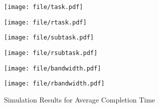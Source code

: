 \documentclass[10pt, conference, letterpaper]{IEEEtran}
\begin{document}
\begin{figure}[t]
    \centering
    \vspace{-0.35cm} %
	\subfigtopskip=2pt %
	\subfigbottomskip=1pt %
	\subfigcapskip=-5pt %
	\begin{minipage}[t]{0.48\linewidth}
		\centering
		\texttt{[image: file/task.pdf]}
		\label{fig_task}
	\end{minipage}
	\begin{minipage}[t]{0.48\linewidth}
		\centering
		\texttt{[image: file/rtask.pdf]}
		\label{fig_rtask}
	\end{minipage}\vspace{-10pt}
    
	\begin{minipage}[t]{0.48\linewidth}
		\texttt{[image: file/subtask.pdf]}
		\label{fig_subtask}
	\end{minipage}
	\begin{minipage}[t]{0.48\linewidth}
		\centering
		\texttt{[image: file/rsubtask.pdf]}
		\label{fig_rsubtask}
	\end{minipage}\vspace{-10pt}
    
	\begin{minipage}[t]{0.48\linewidth}
		\centering
		\texttt{[image: file/bandwidth.pdf]}
		\label{fig_bandwidth}
	\end{minipage}
	\begin{minipage}[t]{0.48\linewidth}
		\centering
		\texttt{[image: file/rbandwidth.pdf]}
		\label{fig_rbandwidth}
	\end{minipage}\vspace{-10pt}
	\centering
    \caption{Simulation Results for Average Completion Time}
    \label{fig_act}
\end{figure}
\end{document}
